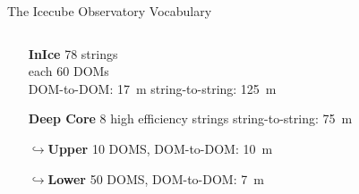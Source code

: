 \begin{frame}{The Icecube Observatory Vocabulary}
\begin{columns}
\begin{column}{.4\textwidth}
\begin{itemize}
                \item [\textbf{InIce}] 78 strings\\ each 60 DOMs\\ DOM-to-DOM: \SI{17}{\meter}
                      string-to-string: \SI{125}{\meter}
                \item [\textbf{Deep Core}] 8 high efficiency strings
                      string-to-string: \SI{75}{\meter}
                      \pause
                \item [\textbf{$\hookrightarrow$Upper}]  10 DOMS, DOM-to-DOM: \SI{10}{\meter}
                \item [\textbf{$\hookrightarrow$Lower}]  50 DOMS, DOM-to-DOM: \SI{7}{\meter}
            \end{itemize}
        \end{column}
        \hspace{-2em}
    \end{columns}
\end{frame}
